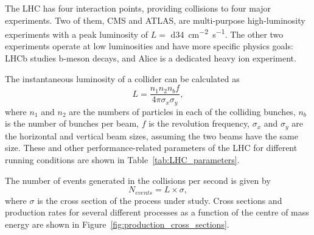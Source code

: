 The LHC has four interaction points, providing collisions to four major experiments. Two of them, CMS and ATLAS, are
multi-purpose high-luminosity experiments with a peak luminosity of $L = $ \SI{d34}{\cm^{-2} s^{-1}}. The other two
experiments operate at low luminosities and have more specific physics goals: LHCb studies b-meson decays, and Alice is
a dedicated heavy ion experiment.

The instantaneous luminosity of a collider can be calculated as
\begin{equation}
	L = \frac{n_1 n_2 n_b f}{4 \pi \sigma_x \sigma_y},
\end{equation}
where $n_1$ and $n_2$ are the numbers of particles in each of the colliding bunches, $n_b$ is the number of bunches per
beam, $f$ is the revolution frequency, $\sigma_x$ and $\sigma_y$ are the horizontal and vertical beam sizes, assuming
the two beams have the same size. These and other performance-related parameters of the LHC for different running
conditions are shown in Table~\ref{tab:LHC_parameters}.

The number of events generated in the collisions per second is given by
\begin{equation}
	N_{events} = L \times \sigma,
\end{equation}
where $\sigma$ is the cross section of the process under study. Cross sections and production rates for several
different processes as a function of the centre of mass energy are shown in Figure~\ref{fig:production_cross_sections}.



